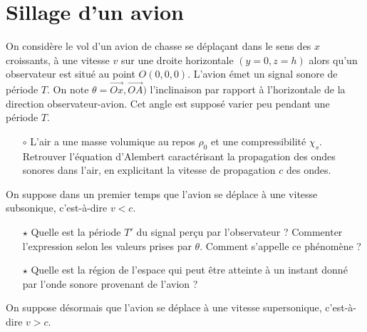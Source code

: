 \documentclass{report}
\begin{document}
\section*{Sillage d'un avion}

On considère le vol d'un avion de chasse se déplaçant dans le sens des $x$ croissants, à une vitesse $v$ sur une droite horizontale $(y=0,z=h)$ alors qu'un observateur est situé au point $O(0,0,0)$. L'avion émet un signal sonore de période $T$. On note $\theta=\vec{Ox},\vec{OA})$ l'inclinaison par rapport à l'horizontale de la direction observateur-avion. Cet angle est supposé varier peu pendant une période $T$.

\begin{itemize}

	\item[$\circ$] L'air a une masse volumique au repos $\rho_0$ et une compressibilité $\chi_s$. Retrouver l'équation d'Alembert caractérisant la propagation des ondes sonores dans l'air, en explicitant la vitesse de propagation $c$ des ondes.

\end{itemize}

On suppose dans un premier temps que l'avion se déplace à une vitesse subsonique, c'est-à-dire $v<c$.

\begin{itemize}

	\item[$\star$] Quelle est la période $T'$ du signal perçu par l'observateur ? Commenter l'expression selon les valeurs prises par $\theta$. Comment s'appelle ce phénomène ?
	
	\item[$\star$] Quelle est la région de l'espace qui peut être atteinte à un instant donné par l'onde sonore provenant de l'avion ?

\end{itemize}

On suppose désormais que l'avion se déplace à une vitesse supersonique, c'est-à-dire $v>c$.
\end{document}
